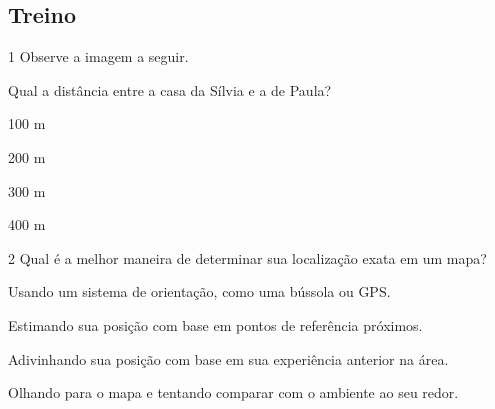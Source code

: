 \begin{escolha}
\begin{escolha}
\begin{escolha}
\begin{escolha}
{\begin{boxmedio}
\begin{boxpeq}
\begin{q°}
\begin{boxmedio}
\begin{boxpeq}
\begin{boxpeq}
\begin{boxmedio}
\begin{boxmedio}
\begin{boxmedio}
\section{Treino}

\num{1} Observe a imagem a seguir.



Qual a distância entre a casa da Sílvia e a de Paula?

\begin{escolha}

  \item 100 m

  \item 200 m

  \item 300 m

  \item 400 m

\end{escolha}


\num{2} Qual é a melhor maneira de determinar sua localização exata em um
mapa? 

\begin{escolha}

  \item Usando um sistema de orientação, como uma bússola ou GPS. 

  \item Estimando sua posição com base em pontos de referência próximos. 

  \item Adivinhando sua posição com base em sua experiência anterior na área. 

  \item Olhando para o mapa e tentando comparar com o ambiente ao seu redor.


\end{escolha}
\end{boxmedio}
\end{boxmedio}
\end{boxmedio}
\end{boxpeq}
\end{boxpeq}
\end{boxmedio}
\end{q°}
\end{boxpeq}
\end{boxmedio}}
\end{escolha}
\end{escolha}
\end{escolha}
\end{escolha}
